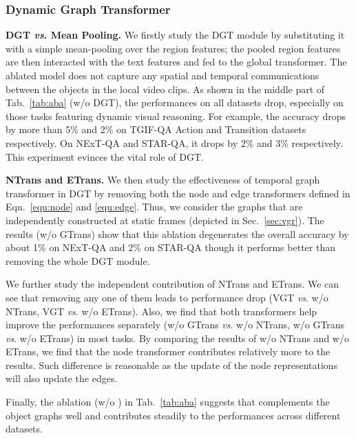 \documentclass[10pt,journal,compsoc]{IEEEtran}
\newcommand{\vs}{\textit{vs}. }
\begin{document}
\subsubsection{Dynamic Graph Transformer}
\textbf{DGT \vs Mean Pooling.} We firstly study the DGT module by substituting it with a simple mean-pooling over the region features; the pooled region features are then interacted with the text features and fed to the global transformer. The ablated model does not capture any spatial and temporal communications between the objects in the local video clips. As shown in the middle part of Tab.~\ref{tab:aba} (w/o DGT), the performances on all datasets drop, especially on those tasks featuring dynamic visual reasoning. For example, the accuracy drops by more than 5\% and 2\% on TGIF-QA Action and Transition datasets respectively. On NExT-QA and STAR-QA, it drops by 2\% and 3\% respectively. This experiment evinces the vital role of DGT.

\textbf{NTrans and ETrans.} We then study the effectiveness of temporal graph transformer in DGT by removing both the node and edge transformers defined in Eqn.~\eqref{equ:node} and \eqref{equ:edge}. Thus, we consider the graphs that are independently constructed at static frames (depicted in Sec.~\ref{sec:vgr}). The results (w/o GTrans) show that this ablation degenerates the overall accuracy by about 1\% on NExT-QA and 2\% on STAR-QA though it performs better than removing the whole DGT module. 

We further study the independent contribution of NTrans and ETrans. We can see that removing any one of them leads to performance drop (VGT \vs w/o NTrans, VGT \vs w/o ETrans). Also, we find that both transformers help improve the performances separately (w/o GTrans \vs w/o NTrans, w/o GTrans \vs w/o ETrans) in most tasks. By comparing the results of w/o NTrans and w/o ETrans, we find that the node transformer contributes relatively more to the results. Such difference is reasonable as the update of the node representations will also update the edges.

Finally, the ablation (w/o ) in Tab.~\ref{tab:aba} suggests that  complements the object graphs well and contributes steadily to the performances across different datasets. 
\end{document}
